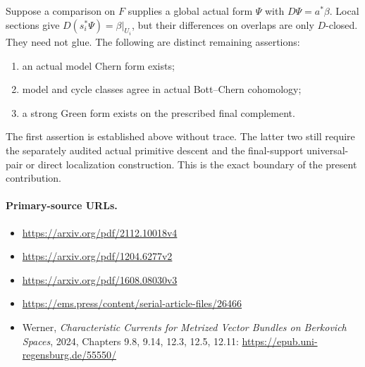 Suppose a comparison on $F$ supplies a global actual form $\Psi$ with
$D\Psi=a^*\beta$.  Local sections give $D(s_i^*\Psi)=\beta|_{U_i}$,
but their differences on overlaps are only $D$-closed.  They need not
glue.  The following are distinct remaining assertions:
\begin{enumerate}
\item an actual model Chern form exists;
\item model and cycle classes agree in actual Bott--Chern cohomology;
\item a strong Green form exists on the prescribed final complement.
\end{enumerate}
The first assertion is established above without trace.  The latter
two still require the separately audited actual primitive descent and
the final-support universal-pair or direct localization construction.
This is the exact boundary of the present contribution.

\paragraph{Primary-source URLs.}
\begin{itemize}
\item \url{https://arxiv.org/pdf/2112.10018v4}
\item \url{https://arxiv.org/pdf/1204.6277v2}
\item \url{https://arxiv.org/pdf/1608.08030v3}
\item \url{https://ems.press/content/serial-article-files/26466}
\item Werner, \emph{Characteristic Currents for Metrized Vector Bundles
on Berkovich Spaces}, 2024, Chapters 9.8, 9.14, 12.3, 12.5, 12.11:
\url{https://epub.uni-regensburg.de/55550/}
\end{itemize}
